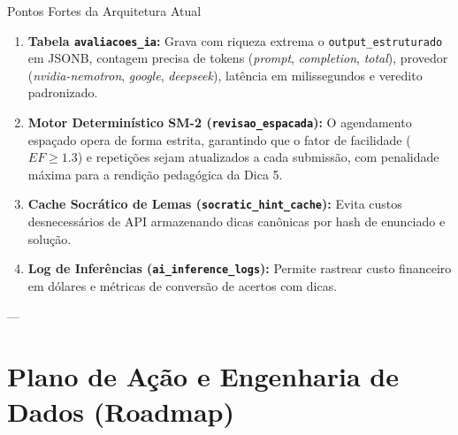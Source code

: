 \documentclass[11pt,a4paper]{article}
\begin{document}
\begin{sucessoBox}{Pontos Fortes da Arquitetura Atual}
\begin{enumerate}[leftmargin=*]
    \item \textbf{Tabela \texttt{avaliacoes\_ia}:} Grava com riqueza extrema o \texttt{output\_estruturado} em JSONB, contagem precisa de tokens (\textit{prompt}, \textit{completion}, \textit{total}), provedor (\textit{nvidia-nemotron}, \textit{google}, \textit{deepseek}), latência em milissegundos e veredito padronizado.
    \item \textbf{Motor Determinístico SM-2 (\texttt{revisao\_espacada}):} O agendamento espaçado opera de forma estrita, garantindo que o fator de facilidade ($EF \ge 1.3$) e repetições sejam atualizados a cada submissão, com penalidade máxima para a rendição pedagógica da Dica 5.
    \item \textbf{Cache Socrático de Lemas (\texttt{socratic\_hint\_cache}):} Evita custos desnecessários de API armazenando dicas canônicas por hash de enunciado e solução.
    \item \textbf{Log de Inferências (\texttt{ai\_inference\_logs}):} Permite rastrear custo financeiro em dólares e métricas de conversão de acertos com dicas.
\end{enumerate}
\end{sucessoBox}

---

\section{Plano de Ação e Engenharia de Dados (Roadmap)}
\end{document}
